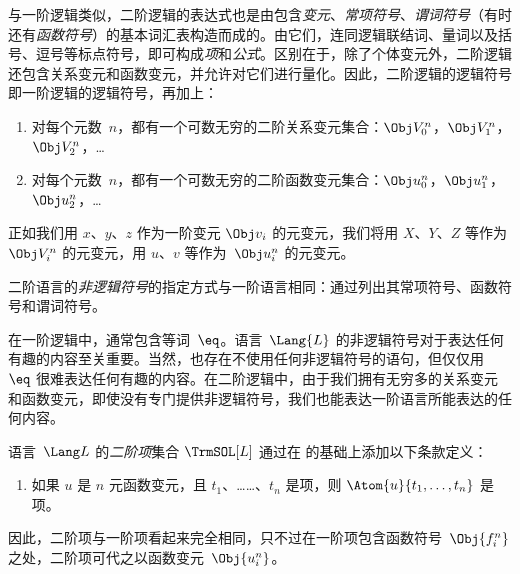 \documentclass[../../../include/open-logic-section]{subfiles}
\begin{document}


与一阶逻辑类似，二阶逻辑的表达式也是由包含\emph{变元}、\emph{常项符号}、\emph{谓词符号}（有时还有\emph{函数符号}）的基本词汇表构造而成的。由它们，连同逻辑联结词、量词以及括号、逗号等标点符号，即可构成\emph{项}和\emph{公式}。区别在于，除了个体变元外，二阶逻辑还包含关系变元和函数变元，并允许对它们进行量化。因此，二阶逻辑的逻辑符号即一阶逻辑的逻辑符号，再加上：

\begin{enumerate}
\item 对每个元数~$n$，都有一个可数无穷的二阶关系变元集合：$\Obj V_0^n$，$\Obj V_1^n$，$\Obj V_2^n$，\dots
\item 对每个元数~$n$，都有一个可数无穷的二阶函数变元集合：$\Obj u_0^n$，$\Obj u_1^n$，$\Obj u_2^n$，\dots
\end{enumerate}

正如我们用 $x$、$y$、$z$ 作为一阶变元 $\Obj v_i$ 的元变元，我们将用 $X$、$Y$、$Z$ 等作为 $\Obj V_i^n$ 的元变元，用 $u$、$v$ 等作为~$\Obj u_i^n$ 的元变元。

\begin{explain}
二阶语言的\emph{非逻辑符号}的指定方式与一阶语言相同：通过列出其常项符号、函数符号和谓词符号。

在一阶逻辑中，通常包含等词~$\eq$。语言~$\Lang{L}$ 的非逻辑符号对于表达任何有趣的内容至关重要。当然，也存在不使用任何非逻辑符号的语句，但仅仅用~$\eq$ 很难表达任何有趣的内容。在二阶逻辑中，由于我们拥有无穷多的关系变元和函数变元，即使没有专门提供非逻辑符号，我们也能表达一阶语言所能表达的任何内容。
\end{explain}

\begin{defn}[二阶项]
语言~$\Lang L$ 的\emph{二阶项}集合 $\TrmSOL[L]$ 通过在  的基础上添加以下条款定义：
\begin{enumerate}
\item 如果 $u$ 是 $n$ 元函数变元，且 $t_1$、……、$t_n$ 是项，则 $\Atom{u}{t_1, \ldots, t_n}$ 是项。
\end{enumerate}
\end{defn}

\begin{explain}
因此，二阶项与一阶项看起来完全相同，只不过在一阶项包含函数符号~$\Obj{f^n_i}$ 之处，二阶项可代之以函数变元~$\Obj{u^n_i}$。
\end{explain}
\end{document}
